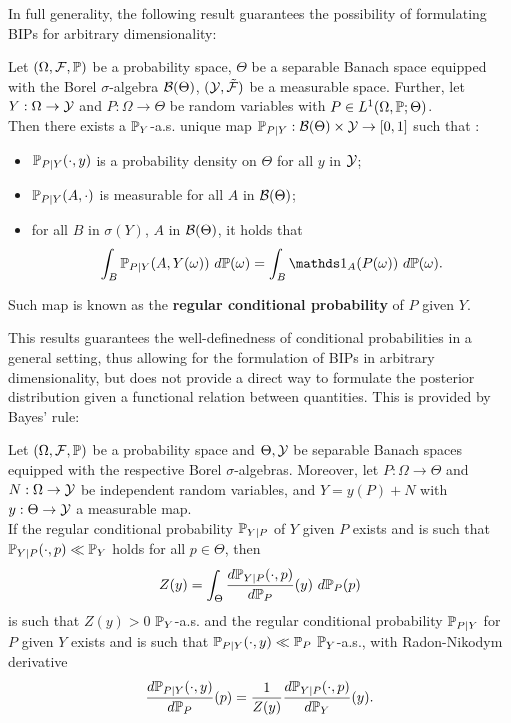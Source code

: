 In full generality, the following result guarantees the possibility of formulating BIPs for arbitrary dimensionality:
\begin{thm} 
    Let $ (\Omega, \mathcal F , \mathbb P) $ be a probability space, $\Theta$ be a separable Banach space equipped with the Borel $\sigma$-algebra $\mathcal B (\Theta)$, $(\mathcal Y, \tilde{\mathcal F})$ be a measurable space.
    Further, let $Y:\Omega \rightarrow \mathcal Y$ and $P : \Omega \rightarrow \Theta$ be random variables with $P \in L^1(\Omega, \mathbb P; \Theta) $. \\
    Then there exists a $\mathbb P_Y$-a.s. unique map $\mathbb P_{P \mid Y} : \mathcal B (\Theta) \times \mathcal Y \rightarrow [0,1] $ such that :
    \begin{itemize}
        \item $\mathbb P_{P \mid Y}(\cdot, y)$ is a probability density on $\Theta$ for all $y$ in $\mathcal Y$;
        \item $\mathbb P_{P \mid Y}(A, \cdot)$ is measurable for all $A$ in $\mathcal B (\Theta)$;
        \item for all $B$ in $\sigma(Y)$, $A$ in $\mathcal B (\Theta)$, it holds that
                \[ 
                \int_B \bb P_{P \mid Y}(A, Y(\omega)) \ d\bb P(\omega)= \int_B \ind_A(P(\omega)) \ d\bb P(\omega).
                \] 
    \end{itemize}
    Such map is known as the \textbf{regular conditional probability} of $P$ given $Y$.
\end{thm}

This results guarantees the well-definedness of conditional probabilities in a general setting, thus allowing for the formulation of BIPs in arbitrary dimensionality, but does not provide a direct way to formulate the posterior distribution given a functional relation between quantities. This is provided by Bayes' rule:

\begin{thm}
    Let $ (\Omega, \mathcal F , \mathbb P) $ be a probability space and $\Theta, \mathcal Y$ be separable Banach spaces equipped with the respective Borel $\sigma$-algebras. 
    Moreover, let $P : \Omega \rightarrow \Theta$ and $N:\Omega \rightarrow \mathcal Y$ be independent random variables, and $ Y = y(P) + N$ with $y: \Theta \rightarrow \mathcal Y$ a measurable map. \\
    If the regular conditional probability $\mathbb P_{Y\mid P}$ of $Y$ given $P$ exists and is such that $\mathbb P_{Y\mid P}(\cdot, p) \ll \mathbb P _Y$ holds for all $p \in \Theta$, then 
    \[ Z(y) = \int_\Theta \frac{d\mathbb P_{Y\mid P}(\cdot, p)}{d\mathbb P_P}(y) \ d\mathbb P_P(p)
     \]
    is such that $ Z(y) > 0$ $\mathbb P_Y$-a.s. and the regular conditional probability $\mathbb P_{P\mid Y}$ for $P$ given $Y$ exists and is such that $\mathbb P_{P\mid Y}(\cdot, y) \ll \mathbb P _P$ $\mathbb P_Y$-a.s., with Radon-Nikodym derivative
    \begin{equation}\label{eq:infdimBayes}
        \frac{d\mathbb P_{P\mid Y}(\cdot, y)}{d\mathbb P_P}(p) = \frac{1}{Z(y)}\frac{d\mathbb P_{Y\mid P}(\cdot, p)}{d\mathbb P_Y}(y).
    \end{equation}
\end{thm}

